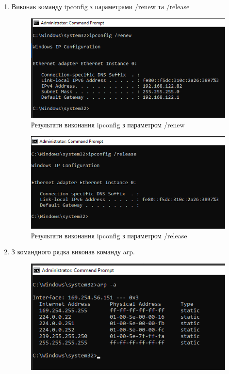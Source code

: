 \documentclass{article}
\begin{document}
\begin{normalsize}
\begin{enumerate}
\item Виконав команду ipconfig з параметрами /renew та /release
\begin{figure}[H]
	\centering
	\includegraphics[scale=0.7]{7}
	\caption{Результати виконання ipconfig з параметром /renew
	}
\end{figure}
\begin{figure}[H]
	\centering
	\includegraphics[scale=0.7]{8}
	\caption{Результати виконання ipconfig з параметром /release
	}
\end{figure}
\item З командного рядка виконав команду arp.
\begin{figure}[H]
	\centering
	\includegraphics[scale=0.7]{9}

\end{figure}
\end{enumerate}
\end{normalsize}
\end{document}
